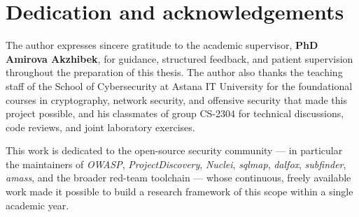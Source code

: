 \chapter{Dedication and acknowledgements}
\begin{SingleSpace}

The author expresses sincere gratitude to the academic supervisor, \textbf{PhD Amirova Akzhibek}, for guidance, structured feedback, and patient supervision throughout the preparation of this thesis. The author also thanks the teaching staff of the School of Cybersecurity at Astana IT University for the foundational courses in cryptography, network security, and offensive security that made this project possible, and his classmates of group CS-2304 for technical discussions, code reviews, and joint laboratory exercises.

This work is dedicated to the open-source security community --- in particular the maintainers of \textit{OWASP}, \textit{ProjectDiscovery}, \textit{Nuclei}, \textit{sqlmap}, \textit{dalfox}, \textit{subfinder}, \textit{amass}, and the broader red-team toolchain --- whose continuous, freely available work made it possible to build a research framework of this scope within a single academic year.

\end{SingleSpace}
\clearpage

